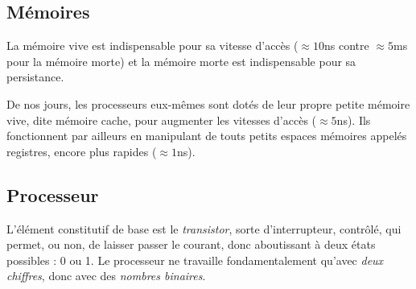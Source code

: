 \subsection{Mémoires}


La mémoire vive est indispensable pour sa vitesse d'accès ($\approx 10$ns contre $\approx 5$ms pour la mémoire morte) et la mémoire morte est indispensable pour sa persistance.

De nos jours, les processeurs eux-mêmes sont dotés de leur propre petite mémoire vive, dite mémoire cache, pour augmenter les vitesses d'accès ($\approx 5$ns). Ils fonctionnent par ailleurs en manipulant de touts petits espaces mémoires appelés registres, encore plus rapides ($\approx 1$ns).



\subsection{Processeur}


L'élément constitutif de base est le \emph{transistor}, sorte d'interrupteur, contrôlé, qui permet, ou non, de laisser passer le courant, donc aboutissant à deux états possibles : 0 ou 1. Le processeur ne travaille fondamentalement qu'avec \emph{deux chiffres}, donc avec des \emph{nombres binaires}.

